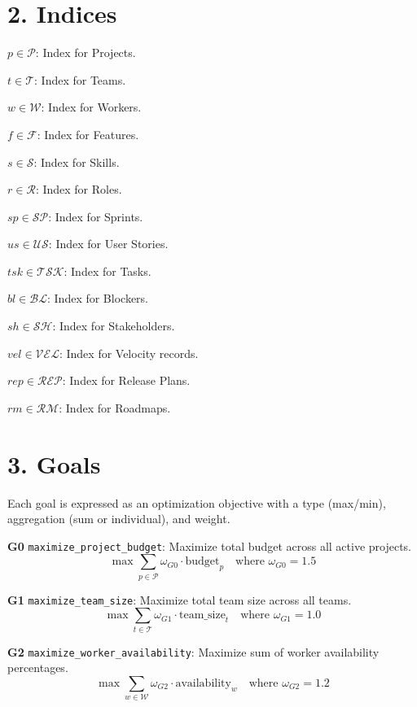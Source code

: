\documentclass[12pt]{article}
\begin{document}
\section{2. Indices}
\item $p \in \mathcal{P}$: Index for Projects.
    \item $t \in \mathcal{T}$: Index for Teams.
    \item $w \in \mathcal{W}$: Index for Workers.
    \item $f \in \mathcal{F}$: Index for Features.
    \item $s \in \mathcal{S}$: Index for Skills.
    \item $r \in \mathcal{R}$: Index for Roles.
    \item $sp \in \mathcal{SP}$: Index for Sprints.
    \item $us \in \mathcal{US}$: Index for User Stories.
    \item $tsk \in \mathcal{TSK}$: Index for Tasks.
    \item $bl \in \mathcal{BL}$: Index for Blockers.
    \item $sh \in \mathcal{SH}$: Index for Stakeholders.
    \item $vel \in \mathcal{VEL}$: Index for Velocity records.
    \item $rep \in \mathcal{REP}$: Index for Release Plans.
    \item $rm \in \mathcal{RM}$: Index for Roadmaps.

\section{3. Goals}
Each goal is expressed as an optimization objective with a type (max/min), aggregation (sum or individual), and weight.

\item[\textbf{G0}] \texttt{maximize\_project\_budget}: Maximize total budget across all active projects.
    \[
    \max \sum_{p \in \mathcal{P}} \omega_{G0} \cdot \text{budget}_p \quad \text{where } \omega_{G0} = 1.5
    \]

    \item[\textbf{G1}] \texttt{maximize\_team\_size}: Maximize total team size across all teams.
    \[
    \max \sum_{t \in \mathcal{T}} \omega_{G1} \cdot \text{team\_size}_t \quad \text{where } \omega_{G1} = 1.0
    \]

    \item[\textbf{G2}] \texttt{maximize\_worker\_availability}: Maximize sum of worker availability percentages.
    \[
    \max \sum_{w \in \mathcal{W}} \omega_{G2} \cdot \text{availability}_w \quad \text{where } \omega_{G2} = 1.2
    \]
\end{document}
